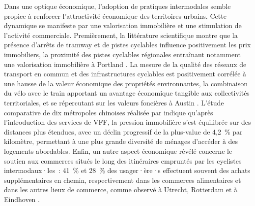\begin{refsegment}
Dans une optique économique, l'adoption de pratiques intermodales semble propice à renforcer l'attractivité économique des territoires urbains. Cette dynamique se manifeste par une valorisation immobilière et une stimulation de l'activité commerciale. Premièrement, la littérature scientifique montre que la présence d'arrêts de tramway et de pistes cyclables influence positivement les prix immobiliers, la proximité des pistes cyclables régionales entraînant notamment une valorisation immobilière à Portland \textcolor{blue}{\autocite[270]{welch_long-term_2016}}. La mesure de la qualité des réseaux de transport en commun et des infrastructures cyclables est positivement corrélée à une hausse de la valeur économique des propriétés environnantes, la combinaison du vélo avec le train apportant un avantage économique tangible aux collectivités territoriales, et se répercutant sur les valeurs foncières à Austin \textcolor{blue}{\autocite[3~495]{li_exploring_2017}}. L'étude comparative de dix métropoles chinoises réalisée par \textcolor{blue}{\textcite[10]{chu_last_2021}} indique qu'après l'introduction des services de \acrshort{VFF}, la pression immobilière s'est équilibrée sur des distances plus étendues, avec un déclin progressif de la plus-value de 4,2~\% par kilomètre, permettant à une plus grande diversité de ménages d'accéder à des logements abordables. Enfin, un autre aspect économique révélé concerne le soutien aux commerces situés le long des itinéraires empruntés par les cyclistes intermodaux·les~: 41~\% et 28~\% des usager·ère·s effectuent souvent des achats supplémentaires en chemin, respectivement dans les commerces alimentaires et dans les autres lieux de commerce, comme observé à Utrecht, Rotterdam et à Eindhoven \textcolor{blue}{\autocite[14]{jonkeren_bicycle-train_2021}}.%


\end{refsegment}
